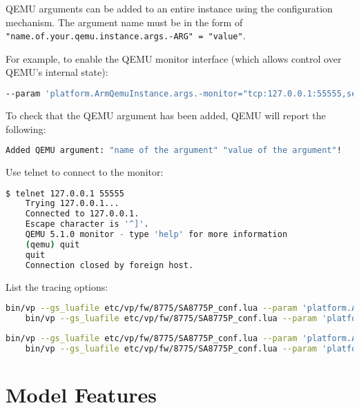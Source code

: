 QEMU arguments can be added to an entire instance using the configuration mechanism. The argument name must be in the form of {\small{\lstinline!"name.of.your.qemu.instance.args.-ARG" = "value"!}}.

For example, to enable the QEMU monitor interface (which allows control over QEMU's internal state):

\small
\begin{lstlisting}[language=bash]
    --param 'platform.ArmQemuInstance.args.-monitor="tcp:127.0.0.1:55555,server,nowait"'!
\end{lstlisting}
\normalsize

To check that the QEMU argument has been added, QEMU will report the following:

\small
\begin{lstlisting}[language=bash]
    Added QEMU argument: "name of the argument" "value of the argument"!
\end{lstlisting}
\normalsize

Use telnet to connect to the monitor:

\small
\begin{lstlisting}[language=bash]
    $ telnet 127.0.0.1 55555
    Trying 127.0.0.1...
    Connected to 127.0.0.1.
    Escape character is '^]'.
    QEMU 5.1.0 monitor - type 'help' for more information
    (qemu) quit
    quit
    Connection closed by foreign host.
\end{lstlisting}
\normalsize

List the tracing options:

\small
\begin{lstlisting}[language=bash]
    bin/vp --gs_luafile etc/vp/fw/8775/SA8775P_conf.lua --param 'platform.ArmQemuInstance.args.-d="help"'
    bin/vp --gs_luafile etc/vp/fw/8775/SA8775P_conf.lua --param 'platform.hexagon_cluster_0.HexagonQemuInstance.args.-d="help"'
\end{lstlisting}
\normalsize

\small
\begin{lstlisting}[language=bash]
    bin/vp --gs_luafile etc/vp/fw/8775/SA8775P_conf.lua --param 'platform.ArmQemuInstance.args.-d="trace:help"'
    bin/vp --gs_luafile etc/vp/fw/8775/SA8775P_conf.lua --param 'platform.hexagon_cluster_0.HexagonQemuInstance.args.-d="trace:help"'
\end{lstlisting}
\normalsize

\clearpage
\section{Model Features}


